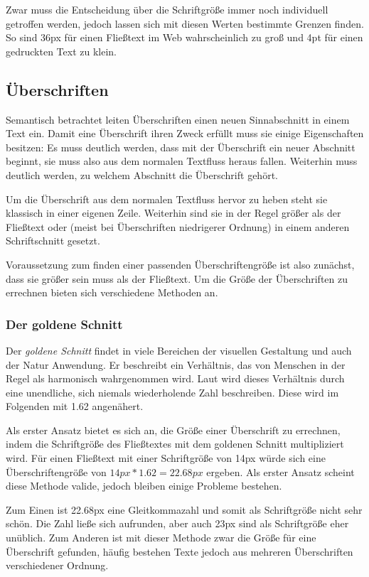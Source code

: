 Zwar muss die Entscheidung über die Schriftgröße immer noch individuell getroffen werden, jedoch lassen sich mit diesen Werten bestimmte Grenzen finden. So sind 36px für einen Fließtext im Web wahrscheinlich zu groß und 4pt für einen gedruckten Text zu klein.

\subsection{Überschriften}
Semantisch betrachtet leiten Überschriften einen neuen Sinnabschnitt in einem Text ein. Damit eine Überschrift ihren Zweck erfüllt muss sie einige Eigenschaften besitzen:
Es muss deutlich werden, dass mit der Überschrift ein neuer Abschnitt beginnt, sie muss also aus dem normalen Textfluss heraus fallen. Weiterhin muss deutlich werden, zu welchem Abschnitt die Überschrift gehört.

Um die Überschrift aus dem normalen Textfluss hervor zu heben steht sie klassisch in einer eigenen Zeile. Weiterhin sind sie in der Regel größer als der Fließtext oder (meist bei Überschriften niedrigerer Ordnung) in einem anderen Schriftschnitt gesetzt.

Voraussetzung zum finden einer passenden Überschriftengröße ist also zunächst, dass sie größer sein muss als der Fließtext. Um die Größe der Überschriften zu errechnen bieten sich verschiedene Methoden an.

\subsubsection{Der goldene Schnitt}
Der \textit{goldene Schnitt} findet in viele Bereichen der visuellen Gestaltung und auch der Natur Anwendung. Er beschreibt ein Verhältnis, das von Menschen in der Regel als harmonisch wahrgenommen wird.
Laut \cite{livio2003golden} wird dieses Verhältnis durch eine unendliche, sich niemals wiederholende Zahl beschreiben. Diese wird im Folgenden mit 1.62 angenähert.

Als erster Ansatz bietet es sich an, die Größe einer Überschrift zu errechnen, indem die Schriftgröße des Fließtextes mit dem goldenen Schnitt multipliziert wird.
Für einen Fließtext mit einer Schriftgröße von 14px würde sich eine Überschriftengröße von \(14px * 1.62 = 22.68px\) ergeben.
Als erster Ansatz scheint diese Methode valide, jedoch bleiben einige Probleme bestehen.

Zum Einen ist 22.68px eine Gleitkommazahl und somit als Schriftgröße nicht sehr schön. Die Zahl ließe sich aufrunden, aber auch 23px sind als Schriftgröße eher unüblich.
Zum Anderen ist mit dieser Methode zwar die Größe für eine Überschrift gefunden, häufig bestehen Texte jedoch aus mehreren Überschriften verschiedener Ordnung.

